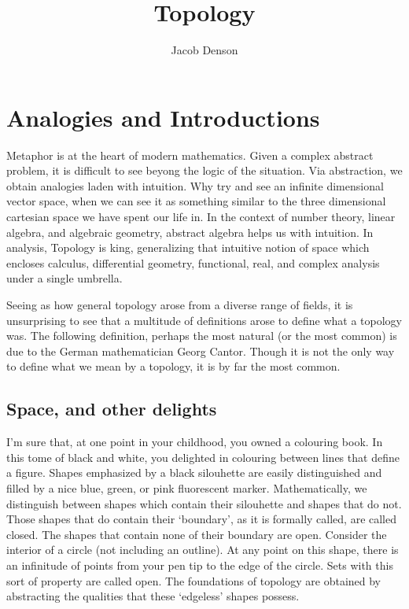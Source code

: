 

\DeclareMathOperator{\Dom}{Dom}

\title{Topology}
\author{Jacob Denson}




\maketitle

\tableofcontents


\chapter{Analogies and Introductions}

Metaphor is at the heart of modern mathematics. Given a complex abstract problem, it is difficult to see beyong the logic of the situation. Via abstraction, we obtain analogies laden with intuition. Why try and see an infinite dimensional vector space, when we can see it as something similar to the three dimensional cartesian space we have spent our life in. In the context of number theory, linear algebra, and algebraic geometry, abstract algebra helps us with intuition. In analysis, Topology is king, generalizing that intuitive notion of space which encloses calculus, differential geometry, functional, real, and complex analysis under a single umbrella.

Seeing as how general topology arose from a diverse range of fields, it is unsurprising to see that a multitude of definitions arose to define what a topology was. The following definition, perhaps the most natural (or the most common) is due to the German mathematician Georg Cantor. Though it is not the only way to define what we mean by a topology, it is by far the most common.

\section{Space, and other delights}

I'm sure that, at one point in your childhood, you owned a colouring book. In this tome of black and white, you delighted in colouring between lines that define a figure. Shapes emphasized by a black silouhette are easily distinguished and filled by a nice blue, green, or pink fluorescent marker. Mathematically, we distinguish between shapes which contain their silouhette and shapes that do not. Those shapes that do contain their `boundary', as it is formally called, are called closed. The shapes that contain none of their boundary are open. Consider the interior of a circle (not including an outline). At any point on this shape, there is an infinitude of points from your pen tip to the edge of the circle. Sets with this sort of property are called open. The foundations of topology are obtained by abstracting the qualities that these `edgeless' shapes possess.

